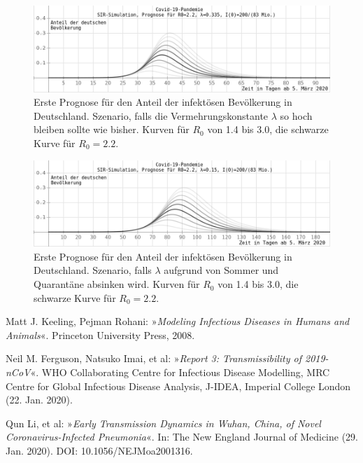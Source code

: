 \documentclass[a4paper,11pt,fleqn,twocolumn,twoside,dvipdfmx]{scrartcl}
\numberwithin{equation}{section}
\begin{document}
\begin{figure}[h]
\includegraphics[width=16cm]{img/Covid-19-Simulation1.png}
\caption{Erste Prognose für den Anteil der infektösen Bevölkerung
in Deutschland.\newline
Szenario, falls die Vermehrungskonstante $\lambda$ so hoch bleiben
sollte wie bisher.\newline
Kurven für $R_0$ von 1.4 bis 3.0, die schwarze Kurve für $R_0=2.2$.}
\end{figure}
\begin{figure}[h]
\includegraphics[width=16cm]{img/Covid-19-Simulation2.png}
\caption{Erste Prognose für den Anteil der infektösen Bevölkerung
in Deutschland.\newline
Szenario, falls $\lambda$ aufgrund von Sommer und Quarantäne
absinken wird.\newline
Kurven für $R_0$ von 1.4 bis 3.0, die schwarze Kurve für $R_0=2.2$.}
\vspace{-6em}
\end{figure}

\clearpage
\twocolumn
\small

\begin{thebibliography}{00}
 Matt J. Keeling, Pejman Rohani:
»\emph{Modeling Infectious Diseases in Humans and Animals}«.
Princeton University Press, 2008.

 Neil M. Ferguson, Natsuko Imai, et al:
»\emph{Report 3: Transmissibility of 2019-nCoV}«.
WHO Collaborating Centre for Infectious Disease Modelling, MRC Centre
for Global Infectious Disease Analysis, J-IDEA, Imperial College London
(22. Jan. 2020).

 Qun Li, et al: »\emph{Early Transmission Dynamics in
Wuhan, China, of Novel Coronavirus-Infected Pneumonia}«.
In: The New England Journal of Medicine (29. Jan. 2020).
DOI: 10.1056/NEJMoa2001316.
\end{thebibliography}
\end{document}
